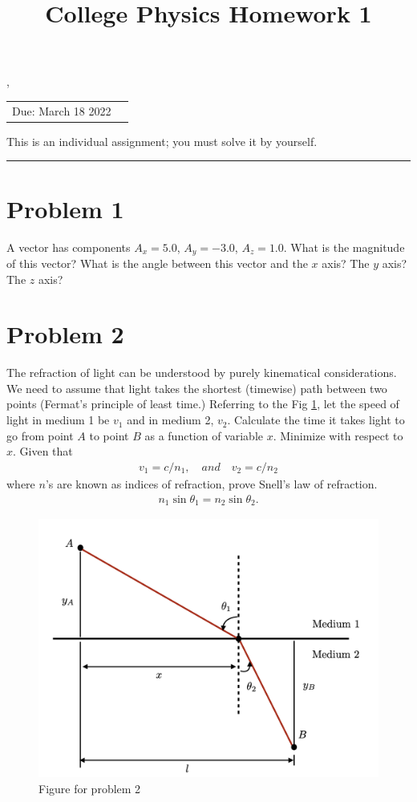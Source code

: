 \documentclass[12pt]{article}
\title{College Physics Homework 1 }
\begin{document}
  \maketitle,
  \begin{center}

  \vspace{-0.3in}
  \begin{tabular}{rl}
  Due: March 18 2022 & 
  \end{tabular}
  \end{center}
  This is an individual assignment; you must solve it by yourself.
  \noindent

  \rule{\linewidth}{0.4pt}
\section*{Problem 1}
A vector has components $A_x=5.0$, $A_{y}=-3.0$, $A_{z}=1.0$. What is the magnitude of this vector? What is the angle between this vector and the $x$ axis? The $y$ axis? The $z$ axis?

  \section*{Problem 2}
The refraction of light can be understood by purely kinematical considerations. We need to assume that light takes the shortest (timewise) path between two points (Fermat's principle of least time.) Referring to the Fig \ref{fig1}, let the speed of light in medium 1 be $v_{1}$ and in medium 2, $v_{2}$. Calculate the time it takes light to go from point $A$ to point $B$ as a function of variable $x$. Minimize with respect to $x$. 
\newline 
Given that
\begin{align}
v_{1}=c/n_{1},\quad and \quad v_{2}=c/n_{2}
\end{align}
where $n$'s are known as indices of refraction, prove Snell's law of refraction.
\begin{align}
n_{1}\sin\theta_{1}=n_{2}\sin\theta_{2}.
\end{align}
\begin{figure}
\center
\includegraphics[scale=0.4]{refraction}
\caption{Figure for problem 2}\label{fig1}
\end{figure}
\newpage
\end{document}
